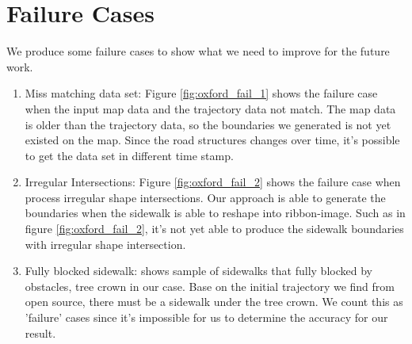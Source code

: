 \section{Failure Cases}

We produce some failure cases to show what we need to improve for the future work. 

\begin{enumerate}
    \item Miss matching data set: Figure \ref{fig:oxford_fail_1} shows the failure case when the input map data and the trajectory data not match. The map data is older than the trajectory data, so the boundaries we generated is not yet existed on the map. Since the road structures changes over time, it's possible to get the data set in different time stamp. 
    \item Irregular Intersections: Figure \ref{fig:oxford_fail_2} shows the failure case when process irregular shape intersections. Our approach is able to generate the boundaries when the sidewalk is able to reshape into ribbon-image. Such as in figure \ref{fig:oxford_fail_2}, it's not yet able to produce the sidewalk boundaries with irregular shape intersection.
    \item Fully blocked sidewalk:  shows sample of sidewalks that fully blocked by obstacles, tree crown in our case. Base on the initial trajectory we find from open source, there must be a sidewalk under the tree crown. We count this as 'failure' cases since it's impossible for us to determine the accuracy for our result. 
\end{enumerate}


